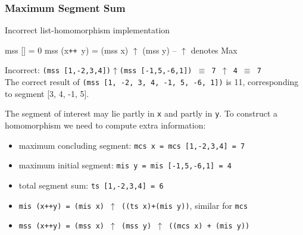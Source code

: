 \documentclass{beamer}
\renewcommand{\emph}[1]{\textcolor{structure}{#1}}
\newcommand{\mymath}[1]{$ #1 $}
\begin{document}
\begin{frame}[fragile,t]
  \frametitle{Maximum Segment Sum}

\begin{block}{Incorrect list-homomorphism implementation}
\begin{colorcode}
mss []       = 0
mss (x{\tt ++}\mbox{ }y) = (mss x) \mymath{\uparrow} (mss y) -- \mymath{\uparrow} denotes Max
\end{colorcode}
\end{block} 

\smallskip

\alert{Incorrect:} {\tt (mss [1,-2,3,4])\mymath{\uparrow}(mss [-1,5,-6,1]) $\equiv$ 7 \mymath{\uparrow} 4 $\equiv$ 7} \\
\emph{The correct result} of {\tt (mss [1, -2, 3, 4, -1, 5, -6, 1])} \emph{is} 11, corresponding to segment [3, 4, -1, 5].

\bigskip

\emph{The segment of interest may lie partly in {\tt x} and partly in {\tt y}.} 
To construct a homomorphism we need to compute extra information:\pause
\begin{itemize}
    \item maximum concluding segment: {\tt mcs x = mcs [1,-2,3,4] = 7}
    \item maximum initial segment: {\tt mis y = mis [-1,5,-6,1] = 4}
    \item total segment sum: {\tt ts [1,-2,3,4] = 6}\pause
    \item {\tt mis (x++y) = (mis x) $\uparrow$ ((ts x)+(mis y))}, similar for {\tt mcs}    
    \item {\tt mss (x++y) = (mss x) $\uparrow$ (mss y) $\uparrow$ ((mcs x) + (mis y))}
\end{itemize}
\end{frame}
\end{document}
